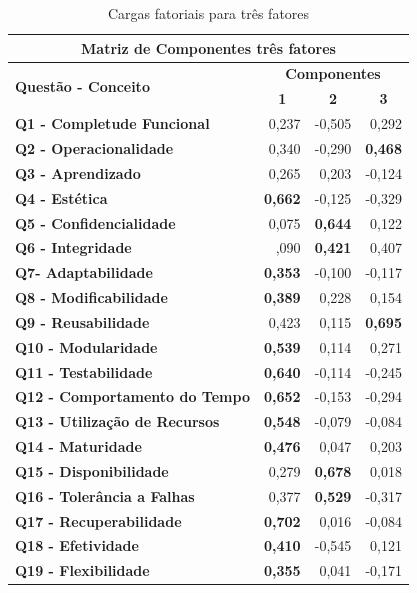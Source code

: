 \begin{apendicesenv}
    \begin{longtable}{rrrr}
    \caption{Cargas fatoriais para três fatores}
            \label{3-fatores}
    \\\hline
    \multicolumn{4}{c}{\textbf{Matriz de Componentes três fatores}} \\
    \hline
    \multicolumn{1}{l}{\multirow{2}[2]{*}{\textbf{Questão - Conceito}}} & \multicolumn{3}{c}{\textbf{Componentes}} \\
    \multicolumn{1}{l}{} & \multicolumn{1}{c}{\textbf{1}} & \multicolumn{1}{c}{\textbf{2}} & \multicolumn{1}{c}{\textbf{3}} \\
    \multicolumn{1}{l}{\textbf{Q1 - Completude Funcional}} & 0,237  & -0,505 & 0,292 \\
    \multicolumn{1}{l}{\textbf{Q2 - Operacionalidade}} & 0,340  & -0,290 & \textbf{0,468} \\
    \multicolumn{1}{l}{\textbf{Q3 - Aprendizado}} & 0,265  & 0,203  & -0,124 \\
    \multicolumn{1}{l}{\textbf{Q4 - Estética}} & \textbf{0,662} & -0,125 & -0,329 \\
    \multicolumn{1}{l}{\textbf{Q5 - Confidencialidade}} & 0,075  & \textbf{0,644} & 0,122 \\
    \multicolumn{1}{l}{\textbf{Q6 - Integridade}} & ,090  & \textbf{0,421} & 0,407 \\
    \multicolumn{1}{l}{\textbf{Q7- Adaptabilidade}} & \textbf{0,353} & -0,100 & -0,117 \\
    \multicolumn{1}{l}{\textbf{Q8 - Modificabilidade}} & \textbf{0,389} & 0,228  & 0,154 \\
    \multicolumn{1}{l}{\textbf{Q9 - Reusabilidade}} & 0,423  & 0,115  & \textbf{0,695} \\
    \multicolumn{1}{l}{\textbf{Q10 - Modularidade}} & \textbf{0,539} & 0,114  & 0,271 \\
    \multicolumn{1}{l}{\textbf{Q11 - Testabilidade}} & \textbf{0,640} & -0,114 & -0,245 \\
    \multicolumn{1}{l}{\textbf{Q12 - Comportamento do Tempo}} & \textbf{0,652} & -0,153 & -0,294 \\
    \multicolumn{1}{l}{\textbf{Q13 - Utilização de Recursos}} & \textbf{0,548} & -0,079 & -0,084 \\
    \multicolumn{1}{l}{\textbf{Q14 - Maturidade}} & \textbf{0,476} & 0,047  & 0,203 \\
    \multicolumn{1}{l}{\textbf{Q15 - Disponibilidade}} & 0,279  & \textbf{0,678} & 0,018 \\
    \multicolumn{1}{l}{\textbf{Q16 - Tolerância a Falhas}} & 0,377 & \textbf{0,529}  & -0,317 \\
    \multicolumn{1}{l}{\textbf{Q17 - Recuperabilidade}} & \textbf{0,702} & 0,016  & -0,084 \\
    \multicolumn{1}{l}{\textbf{Q18 - Efetividade}} & \textbf{0,410} & -0,545 & 0,121 \\
    \multicolumn{1}{l}{\textbf{Q19 - Flexibilidade}} & \textbf{0,355} & 0,041  & -0,171 \\
    \hline
    \end{longtable}%
    

\end{apendicesenv}
